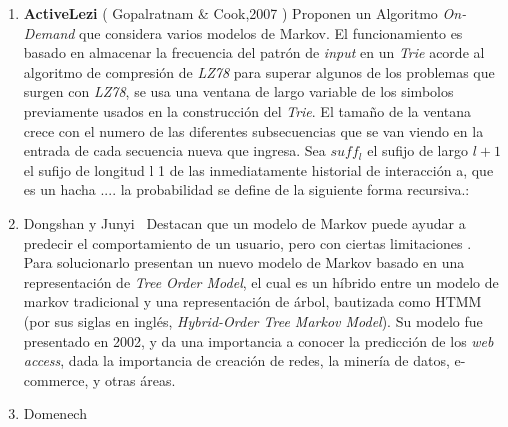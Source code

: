 \begin{enumerate}
{	%
	
	
	
	
	}
  \item \textbf{ActiveLezi} ( Gopalratnam \& Cook,2007 \etal\cite{Gopalratnam2007}) 
  {  
  Proponen un Algoritmo \emph{On-Demand} que considera varios modelos de Markov.  
  El funcionamiento es basado en almacenar la frecuencia del patrón de \emph{input} en un \emph{Trie} acorde al algoritmo de compresión de \emph{LZ78} para superar algunos de los problemas que surgen con \emph{LZ78}, se usa una ventana de largo variable de los simbolos previamente usados en la construcción del \emph{Trie}. El tamaño de la ventana crece con el numero de las diferentes subsecuencias que se van viendo en la entrada de cada secuencia nueva que ingresa.  Sea $suff_{l}$  el sufijo de largo $l+1$ el sufijo de longitud l 1 de las inmediatamente historial de interacción a, que es un hacha .... la probabilidad se define de la siguiente forma recursiva.:
 }



  \item Dongshan y Junyi~\cite{Dongshan2002} 
  {
	  Destacan que un modelo de Markov puede ayudar a predecir el comportamiento de un usuario, pero con ciertas limitaciones .  Para solucionarlo presentan un nuevo modelo de Markov basado en una representación de \emph{Tree Order Model}, el cual es un híbrido entre un modelo de markov tradicional y una representación de árbol, bautizada como HTMM (por sus siglas en inglés, \emph{Hybrid-Order Tree Markov Model}).
	  Su modelo fue presentado en 2002, y da una importancia a conocer la predicción de los \emph{web access}, dada la importancia de creación de redes, la minería de datos, e-commerce, y otras áreas.
	}
  \item Domenech \etal~\cite{Domenech2006}
  

\end{enumerate}
